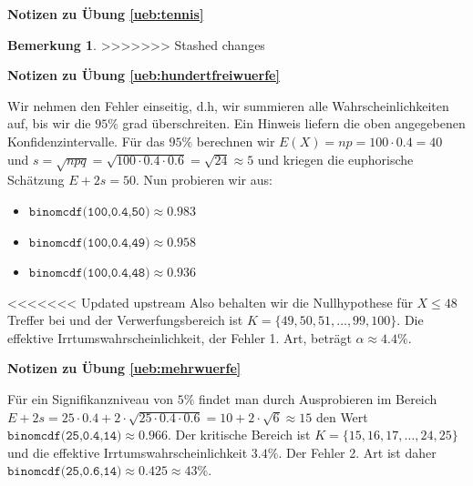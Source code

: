 \documentclass[%
<<<<<<< Updated upstream
<<<<<<< Updated upstream
11pt,%
twoside,%
titlepage,%
german,%
=======
=======
>>>>>>> Stashed changes
11pt,%
twoside,%
titlepage,%
swissgerman,%
<<<<<<< Updated upstream
>>>>>>> Stashed changes
=======
>>>>>>> Stashed changes
headsepline%
]{scrartcl}
\newcommand{\faReturnGray}{\textcolor{gray}{\faMailReply}} %
\theoremstyle{definition}
\newtheorem{bem}{Bemerkung}[subsection] %
\theoremstyle{plain}
\newcommand{\concatueb}[1]{ueb:#1}%
\newcommand{\concatlsg}[1]{lsg:#1}%
\newenvironment{lsg}[1]{%
    \par\noindent\textbf{Notizen zu Übung \ref{\concatueb{#1}}}\label{\concatlsg{#1}}
    \hfill\hyperref[\concatueb{#1}]{\faReturnGray}\par %
}{%
    \par%
}
\newcounter{theo}[section]\setcounter{theo}{0}
\newcommand{\concatueb}[1]{ueb:#1}%
\newcommand{\concatlsg}[1]{lsg:#1}%
\newenvironment{lsg}[1]{%
    \par\noindent\textbf{Notizen zu Übung \ref{\concatueb{#1}}.}%
    \label{\concatlsg{#1}}
}{%
    \par%
}
\begin{document}
\begin{lsg}{tennis}
\begin{bem}
>>>>>>> Stashed changes
\begin{lsg}{hundertfreiwuerfe}
    Wir nehmen den Fehler einseitig, d.h, wir summieren alle Wahrscheinlichkeiten auf, bis wir die $95\%$ grad überschreiten. Ein Hinweis liefern die oben angegebenen Konfidenzintervalle. Für das $95\%$ berechnen wir $E(X)=np=100\cdot0.4=40$ und $s=\sqrt{npq}=\sqrt{100\cdot0.4\cdot0.6}=\sqrt{24}\approx5$ und kriegen die euphorische Schätzung $E+2s=50$. Nun probieren wir aus:
    \begin{itemize}
        \item $\texttt{binomcdf(100,0.4,50)}\approx0.983$
        \item $\texttt{binomcdf(100,0.4,49)}\approx0.958$
        \item $\texttt{binomcdf(100,0.4,48)}\approx0.936$
    \end{itemize}
<<<<<<< Updated upstream
    Also behalten wir die Nullhypothese für $X\leq48$ Treffer bei und der Verwerfungsbereich ist $K=\{49,50,51,\dots,99,100\}$. Die effektive Irrtumswahrscheinlichkeit, der Fehler 1. Art, beträgt $\alpha\approx4.4\%$.
\end{lsg}
\begin{lsg}{mehrwuerfe}
    Für ein Signifikanzniveau von $5\%$ findet man durch Ausprobieren im Bereich $E+2s=25\cdot0.4+2\cdot\sqrt{25\cdot0.4\cdot0.6}=10+2\cdot\sqrt{6}\approx15$ den Wert $\texttt{binomcdf(25,0.4,14)}\approx0.966$. Der kritische Bereich ist $K=\{15,16,17,\dots,24,25\}$ und die effektive Irrtumswahrscheinlichkeit $3.4\%$. Der Fehler 2. Art ist daher\linebreak $\texttt{binomcdf(25,0.6,14)}\approx0.425\approx43\%$.


\end{lsg}
\end{bem}
\end{lsg}
\end{document}
